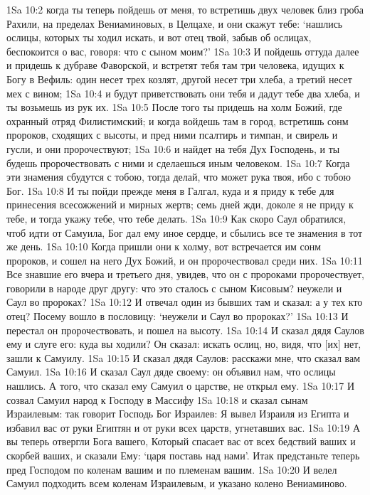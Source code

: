 1Sa 10:2  когда ты теперь пойдешь от меня, то встретишь двух человек близ гроба Рахили, на пределах Вениаминовых, в Целцахе, и они скажут тебе: `нашлись ослицы, которых ты ходил искать, и вот отец твой, забыв об ослицах, беспокоится о вас, говоря: что с сыном моим?'
1Sa 10:3  И пойдешь оттуда далее и придешь к дубраве Фаворской, и встретят тебя там три человека, идущих к Богу в Вефиль: один несет трех козлят, другой несет три хлеба, а третий несет мех с вином;
1Sa 10:4  и будут приветствовать они тебя и дадут тебе два хлеба, и ты возьмешь из рук их.
1Sa 10:5  После того ты придешь на холм Божий, где охранный отряд Филистимский; и когда войдешь там в город, встретишь сонм пророков, сходящих с высоты, и пред ними псалтирь и тимпан, и свирель и гусли, и они пророчествуют;
1Sa 10:6  и найдет на тебя Дух Господень, и ты будешь пророчествовать с ними и сделаешься иным человеком.
1Sa 10:7  Когда эти знамения сбудутся с тобою, тогда делай, что может рука твоя, ибо с тобою Бог.
1Sa 10:8  И ты пойди прежде меня в Галгал, куда и я приду к тебе для принесения всесожжений и мирных жертв; семь дней жди, доколе я не приду к тебе, и тогда укажу тебе, что тебе делать.
1Sa 10:9  Как скоро Саул обратился, чтоб идти от Самуила, Бог дал ему иное сердце, и сбылись все те знамения в тот же день.
1Sa 10:10  Когда пришли они к холму, вот встречается им сонм пророков, и сошел на него Дух Божий, и он пророчествовал среди них.
1Sa 10:11  Все знавшие его вчера и третьего дня, увидев, что он с пророками пророчествует, говорили в народе друг другу: что это сталось с сыном Кисовым? неужели и Саул во пророках?
1Sa 10:12  И отвечал один из бывших там и сказал: а у тех кто отец? Посему вошло в пословицу: `неужели и Саул во пророках?'
1Sa 10:13  И перестал он пророчествовать, и пошел на высоту.
1Sa 10:14  И сказал дядя Саулов ему и слуге его: куда вы ходили? Он сказал: искать ослиц, но, видя, что [их] нет, зашли к Самуилу.
1Sa 10:15  И сказал дядя Саулов: расскажи мне, что сказал вам Самуил.
1Sa 10:16  И сказал Саул дяде своему: он объявил нам, что ослицы нашлись. А того, что сказал ему Самуил о царстве, не открыл ему.
1Sa 10:17  И созвал Самуил народ к Господу в Массифу
1Sa 10:18  и сказал сынам Израилевым: так говорит Господь Бог Израилев: Я вывел Израиля из Египта и избавил вас от руки Египтян и от руки всех царств, угнетавших вас.
1Sa 10:19  А вы теперь отвергли Бога вашего, Который спасает вас от всех бедствий ваших и скорбей ваших, и сказали Ему: `царя поставь над нами'. Итак предстаньте теперь пред Господом по коленам вашим и по племенам вашим.
1Sa 10:20  И велел Самуил подходить всем коленам Израилевым, и указано колено Вениаминово.
